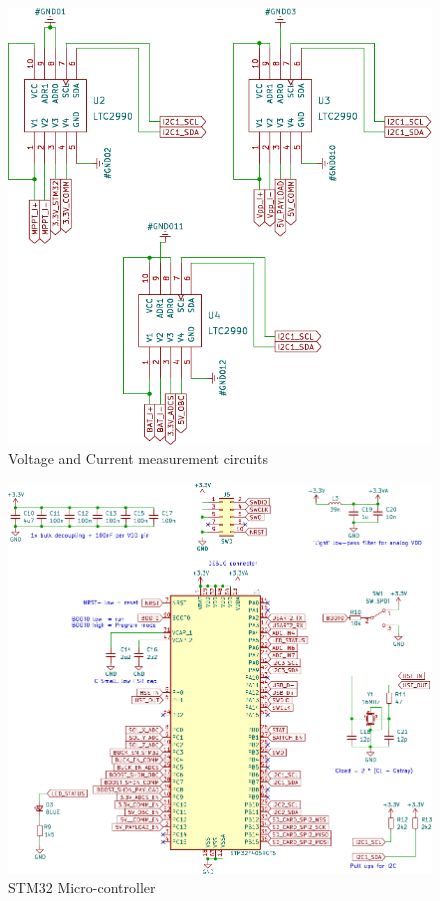   \begin{figure}[H]
 	\centering
 	\includegraphics[width=0.99\columnwidth]{FrontMatter/pcb-MeasurementCircuit.pdf}
 	\caption{\centering Voltage and Current measurement circuits}
 	\label{fig:mes 4lr}
 \end{figure}
 
   \begin{figure}[H]
 	\centering
 	\includegraphics[width=0.99\columnwidth]{FrontMatter/pcb-STM32F405board.pdf}
 	\caption{\centering STM32 Micro-controller}
 	\label{fig:uC 4lr}
 \end{figure}


